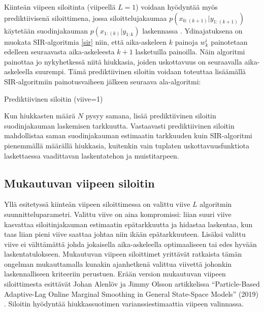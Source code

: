 \documentclass[
  12pt,
  a4paper, twoside]{book}
\begin{document}
Kiinteän viipeen siloitinta (viipeellä \(L=1\)) voidaan hyödyntää myös prediktiivisenä siloittimena, jossa siloittelujakaumaa \(p(x_{0:(k+1)}|y_{1:(k+1)})\) käytetään suodinjakauman \(p(x_{1:(k)}|y_{1:k})\) laskennassa \citep{Nyobe-2021}. Ydinajatuksena on muokata SIR-algoritmia \ref{sir} niin, että aika-askeleen \(k\) painoja \(w_k^i\) painotetaan edelleen seuraavasta aika-askeleesta \(k+1\) lasketuilla painoilla. Näin algoritmi painottaa jo nykyhetkessä niitä hiukkasia, joiden uskottavuus on seuraavalla aika-askeleella suurempi. Tämä prediktiivinen siloitin voidaan toteuttaa lisäämällä SIR-algoritmiin painotusvaiheen jälkeen seuraava ala-algoritmi:

\begin{algorithm}[H]
\label{prediktiivinen-siloitin}
\DontPrintSemicolon
\SetAlgoShortEnd
{}
\caption{Prediktiivinen siloitin (viive=1)}
\end{algorithm}

Kun hiukkasten määrä \(N\) pysyy samana, lisää prediktiivinen siloitin suodinjakauman laskemisen tarkkuutta. Vastaavasti prediktiivinen siloitin mahdollistaa saman suodinjakauman estimaatin tarkkuuden kuin SIR-algoritmi pienemmällä määrällä hiukkasia, kuitenkin vain tuplaten uskottavuusfunktiota laskettaessa vaadittavan laskentatehon ja muistitarpeen.

\subsection{Mukautuvan viipeen siloitin}

Yllä esitetyssä kiinteän viipeen siloittimessa on valittu viive \(L\) algoritmin suunnitteluparametri. Valittu viive on aina kompromissi: liian suuri viive kasvattaa siloitinjakauman estimaatin epätarkkuutta ja hidastaa laskentaa, kun taas liian pieni viive saattaa johtaa niin ikään epätarkkuuteen. Lisäksi valittu viive ei välttämättä johda jokaisella aika-askeleella optimaaliseen tai edes hyvään laskentatulokseen. Mukautuvan viipeen siloittimet yrittävät ratkaista tämän ongelman mukauttamalla kunakin ajanhetkenä valittua viivettä johonkin laskennalliseen kriteeriin perustuen. Erään version mukautuvan viipeen siloittimesta esittävät Johan Alenlöv ja Jimmy Olsson artikkelissa ``Particle-Based Adaptive-Lag Online Marginal Smoothing in General State-Space Models'' (2019) \citep{alenlov-2019}. Siloitin hyödyntää hiukkassuotimen varianssiestimaattia viipeen valinnassa.
\end{document}
